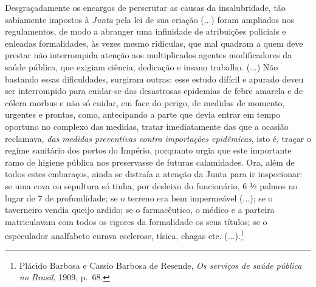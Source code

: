 Desgraçadamente os encargos de perscrutar as causas da insalubridade,
tão sabiamente impostos à \emph{Junta} pela lei de sua criação (...)
foram ampliados nos regulamentos, de modo a abranger uma infinidade de
atribuições policiais e enleadas formalidades, às vezes mesmo ridículas,
que mal quadram a quem deve prestar não interrompida atenção aos
multiplicados agentes modificadores da saúde pública, que exigiam
ciência, dedicação e insano trabalho. (...) Não bastando essas
dificuldades, surgiram outras: esse estudo difícil e apurado deveu ser
interrompido para cuidar-se das desastrosas epidemias de febre amarela e
de cólera morbus e não só cuidar, em face do perigo, de medidas de
momento, urgentes e prontas, como, antecipando a parte que devia entrar
em tempo oportuno no complexo das medidas, tratar imediatamente das que
a ocasião reclamava, \emph{das medidas preventivas contra importações
epidêmicas}, isto é, traçar o regime sanitário dos portos do Império,
porquanto urgia que este importante ramo de higiene pública nos
preservasse de futuras calamidades. Ora, além de todos estes embaraços,
ainda se distraía a atenção da Junta para ir inspecionar: se uma cova ou
sepultura só tinha, por desleixo do funcionário, 6 ½ palmos no lugar de
7 de profundidade; se o terreno era bem impermeável (...); se o
taverneiro vendia queijo ardido; se o farmacêutico, o médico e a
parteira matriculavam com todos os rigores da formalidade os seus
títulos; se o especulador analfabeto curava esclerose, tísica, chagas
etc. (...).\footnote{Plácido Barbosa e Cassio Barbosa de Resende,
  \emph{Os serviços de saúde pública no Brasil}, 1909, p.~68.}

